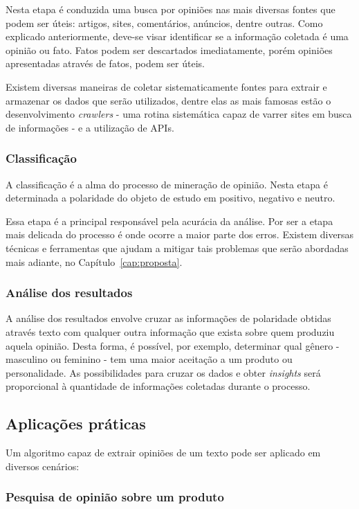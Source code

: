 Nesta etapa é conduzida uma busca por opiniões nas mais diversas fontes que podem ser úteis: artigos, sites, comentários, anúncios, dentre outras. Como explicado anteriormente, deve-se visar identificar se a informação coletada é uma opinião ou fato. Fatos podem ser descartados imediatamente, porém opiniões apresentadas através de fatos, podem ser úteis.

Existem diversas maneiras de coletar sistematicamente fontes para extrair e armazenar os dados que serão utilizados, dentre elas as mais famosas estão o desenvolvimento \textit{crawlers} - uma rotina sistemática capaz de varrer sites em busca de informações - e a utilização de APIs.

\subsubsection{Classificação}

A classificação é a alma do processo de mineração de opinião. Nesta etapa é determinada a polaridade do objeto de estudo em positivo, negativo e neutro.

Essa etapa é a principal responsável pela acurácia da análise. Por ser a etapa mais delicada do processo é onde ocorre a maior parte dos erros. Existem diversas técnicas e ferramentas que ajudam a mitigar tais problemas que serão abordadas mais adiante, no Capítulo~\ref{cap:proposta}.

\subsubsection{Análise dos resultados}

A análise dos resultados envolve cruzar as informações de polaridade obtidas através texto com qualquer outra informação que exista sobre quem produziu aquela opinião. Desta forma, é possível, por exemplo, determinar qual gênero - masculino ou feminino - tem uma maior aceitação a um produto ou personalidade. As possibilidades para cruzar os dados e obter \textit{insights} será proporcional à quantidade de informações coletadas durante o processo.

\subsection{Aplicações práticas}

Um algoritmo capaz de extrair opiniões de um texto pode ser aplicado em diversos cenários:

\subsubsection{Pesquisa de opinião sobre um produto}

